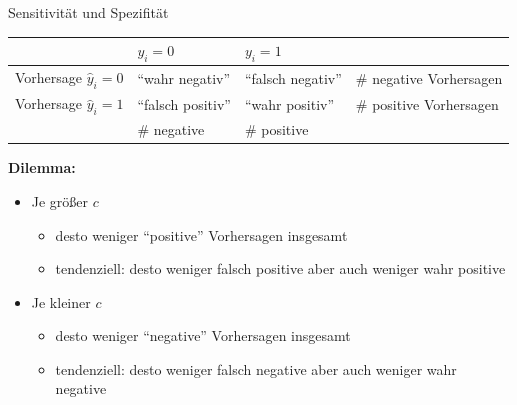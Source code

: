 \documentclass[
  10pt,
  ignorenonframetext,
]{beamer}
\providecommand{\tightlist}{%
  \setlength{\itemsep}{0pt}\setlength{\parskip}{0pt}}
\begin{document}
\begin{frame}{Sensitivität und Spezifität}
\protect\hypertarget{sensitivituxe4t-und-spezifituxe4t-1}{}
\begin{small}
\begin{tabular}{l|ll|l}
& $y_i = 0$ & $y_i = 1$ & \\
\hline
Vorhersage $\hat y_i = 0$ &  ``wahr negativ'' &  ``falsch
negativ'' & \# negative Vorhersagen\\
Vorhersage $\hat y_i = 1$ &  ``falsch positiv'' &  ``wahr
positiv''& \# positive Vorhersagen\\
\hline
& \# negative & \# positive \\
\end{tabular}
\end{small}

\textbf{Dilemma:}

\begin{itemize}
\tightlist
\item
  Je größer \(c\)

  \begin{itemize}
  \tightlist
  \item
    desto weniger ``positive'' Vorhersagen insgesamt
  \item
    tendenziell: desto weniger falsch positive aber auch weniger wahr
    positive
  \end{itemize}
\item
  Je kleiner \(c\)

  \begin{itemize}
  \tightlist
  \item
    desto weniger ``negative'' Vorhersagen insgesamt
  \item
    tendenziell: desto weniger falsch negative aber auch weniger wahr
    negative
  \end{itemize}
\end{itemize}
\end{frame}
\end{document}
